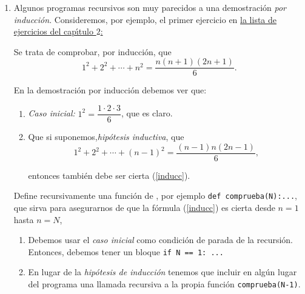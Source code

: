 \begin{enumerate}
\begin{enumerate}
\item {\sc Ejercicio \#401:} Pide que se eval\'ue la suma de todos los cuadrados
de los divisores de un n\'umero $n$, y luego que se sumen esas sumas para $n$
entre $1$ y $N$. Puede ser dif\'{\i}cil evaluar esas sumas eficientemente para
$N$ muy grande. 
\item {\sc Ejercicio \#413:} Es un ejercicio en el manejo de cadenas de caracteres.
\item {\sc Ejercicio \#414:} En este se utilizan listas y el c\'alculo de \hyperref[orbitas]{\'orbitas}.
\item {\sc Ejercicio \#421:} Factorizaci\'on de enteros y de polinomios. {\sage} ser\'a de gran ayuda para resolverlo.
\item {\sc Ejercicio \#429:} Otro ejercicio sobre divisores de un entero.



\end{enumerate}

\item \label{induccion}Algunos programas recursivos son muy parecidos a una demostraci\'on
{\itshape por inducci\'on}. Consideremos,  por ejemplo, el primer ejercicio en 
\hyperref[rec]{la lista de ejercicios del cap\'{\i}tulo $2$:}

Se trata de comprobar, por inducci\'on, que 
\begin{equation}\label{inducc}
1^2+2^2+\cdots+n^2= \dfrac{n(n+1)(2n+1)}6.
\end{equation}

En la demostraci\'on por inducci\'on debemos ver que:

\begin{enumerate}
 \item {\itshape Caso inicial:} $1^2=\dfrac{1\cdot 2\cdot 3}6$, que es claro.
 \item Que si suponemos,{\itshape hip\'otesis inductiva},  que 
 \[ 1^2+2^2+\cdots+(n-1)^2= \dfrac{(n-1)n(2n-1)}6,\]
 
 \noindent entonces tambi\'en debe ser cierta (\ref{inducc}).
\end{enumerate}


{\sc Define recursivamente}  una funci\'on de {\sage}, por ejemplo
\lstinline|def comprueba(N):...|,  que sirva para asegurarnos de que la
f\'ormula (\ref{inducc}) es cierta desde $n=1$ hasta $n=N$, 

\begin{enumerate}
\item Debemos usar el {\itshape caso inicial} como condici\'on de parada de la
recursi\'on. Entonces, debemos tener un bloque \lstinline|if N == 1: ...| 
\item En lugar de la {\itshape hip\'otesis de inducci\'on} tenemos que incluir
en alg\'un lugar del 
programa una llamada recursiva a la propia funci\'on
\lstinline|comprueba(N-1)|.
\end{enumerate}



\end{enumerate}
